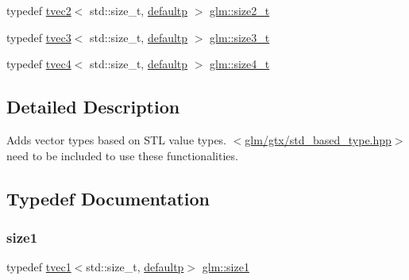 \begin{DoxyCompactItemize}
typedef \mbox{\hyperlink{structglm_1_1tvec2}{tvec2}}$<$ std\+::size\+\_\+t, \mbox{\hyperlink{namespaceglm_a0f04f086094c747d227af4425893f545a9d21ccd8b5a009ec7eb7677befc3bf51}{defaultp}} $>$ \mbox{\hyperlink{group__gtx__std__based__type_ga47b1e2bca519b02eb8500a240216b5de}{glm\+::size2\+\_\+t}}
\item 
typedef \mbox{\hyperlink{structglm_1_1tvec3}{tvec3}}$<$ std\+::size\+\_\+t, \mbox{\hyperlink{namespaceglm_a0f04f086094c747d227af4425893f545a9d21ccd8b5a009ec7eb7677befc3bf51}{defaultp}} $>$ \mbox{\hyperlink{group__gtx__std__based__type_ga689991bc66c16637f043ade5cbb87260}{glm\+::size3\+\_\+t}}
\item 
typedef \mbox{\hyperlink{structglm_1_1tvec4}{tvec4}}$<$ std\+::size\+\_\+t, \mbox{\hyperlink{namespaceglm_a0f04f086094c747d227af4425893f545a9d21ccd8b5a009ec7eb7677befc3bf51}{defaultp}} $>$ \mbox{\hyperlink{group__gtx__std__based__type_gaa4f69cfac1c3e014a50fd090974092ec}{glm\+::size4\+\_\+t}}
\end{DoxyCompactItemize}


\subsection{Detailed Description}
Adds vector types based on S\+TL value types. $<$\mbox{\hyperlink{std__based__type_8hpp}{glm/gtx/std\+\_\+based\+\_\+type.\+hpp}}$>$ need to be included to use these functionalities. 



\subsection{Typedef Documentation}
\mbox{\label{group__gtx__std__based__type_ga3550330d27cef40f7694130b501be73a}} 
\subsubsection{\texorpdfstring{size1}{size1}}
{\footnotesize\ttfamily typedef \mbox{\hyperlink{structglm_1_1tvec1}{tvec1}}$<$std\+::size\+\_\+t, \mbox{\hyperlink{namespaceglm_a0f04f086094c747d227af4425893f545a9d21ccd8b5a009ec7eb7677befc3bf51}{defaultp}}$>$ \mbox{\hyperlink{group__gtx__std__based__type_ga3550330d27cef40f7694130b501be73a}{glm\+::size1}}}


